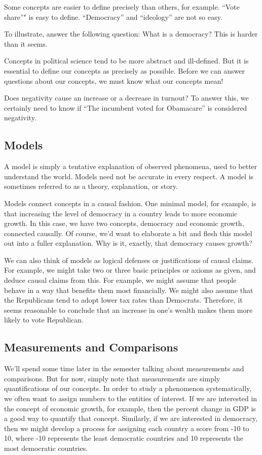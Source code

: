 \documentclass[]{book}
\theoremstyle{definition}
\theoremstyle{definition}
\theoremstyle{definition}
\theoremstyle{remark}
\begin{document}
Some concepts are easier to define precisely than others, for example.
``Vote share''" is easy to define. ``Democracy'' and ``ideology'' are
not so easy.

To illustrate, answer the following question: What is a democracy? This
is harder than it seems.

Concepts in political science tend to be more abstract and ill-defined.
But it is essential to define our concepts as precisely as possible.
Before we can answer questions about our concepts, we must know what our
concepts mean!

Does negativity cause an increase or a decrease in turnout? To answer
this, we certainly need to know if ``The incumbent voted for Obamacare''
is considered negativity.

\subsection{Models}\label{models-1}

A model is simply a tentative explanation of observed phenomena, used to
better understand the world. Models need not be accurate in every
respect. A model is sometimes referred to as a theory, explanation, or
story.

Models connect concepts in a causal fashion. One minimal model, for
example, is that increasing the level of democracy in a country leads to
more economic growth. In this case, we have two concepts, democracy and
economic growth, connected causally. Of course, we'd want to elaborate a
bit and flesh this model out into a fuller explanation. Why is it,
exactly, that democracy causes growth?

We can also think of models as logical defenses or justifications of
causal claims. For example, we might take two or three basic principles
or axioms as given, and deduce causal claims from this. For example, we
might assume that people behave in a way that benefits them most
financially. We might also assume that the Republicans tend to adopt
lower tax rates than Democrats. Therefore, it seems reasonable to
conclude that an increase in one's wealth makes them more likely to vote
Republican.

\subsection{Measurements and
Comparisons}\label{measurements-and-comparisons}

We'll spend some time later in the semester talking about measurements
and comparisons. But for now, simply note that measurements are simply
quantifications of our concepts. In order to study a phenomenon
systematically, we often want to assign numbers to the entities of
interest. If we are interested in the concept of economic growth, for
example, then the percent change in GDP is a good way to quantify that
concept. Similarly, if we are interested in democracy, then we might
develop a process for assigning each country a score from -10 to 10,
where -10 represents the least democratic countries and 10 represents
the most democratic countries.
\end{document}
